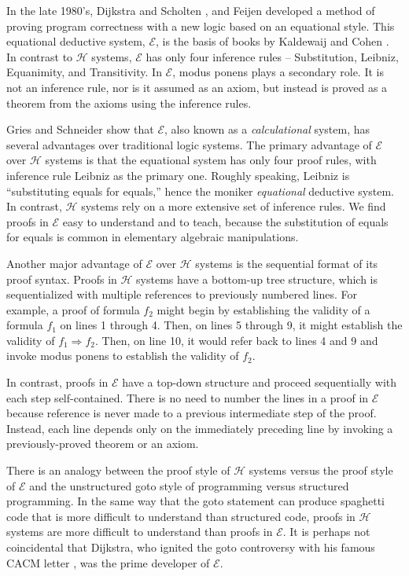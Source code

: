 \documentclass[12pt, fleqn, leqno]{article}
\newcommand{\impl}{\ensuremath{\Rightarrow}}        %
\begin{document}
In the late 1980's, Dijkstra and Scholten \cite{DandS}, and Feijen \cite{Feij} developed a method of proving program correctness with a new logic based on an equational style.
This equational deductive system, $\mathcal{E}$, is the basis of books by Kaldewaij \cite{Kald} and Cohen \cite{Cohen}.
In contrast to $\mathcal{H}$ systems, $\mathcal{E}$ has only four inference rules -- Substitution, Leibniz, Equanimity, and Transitivity.
In $\mathcal{E}$, modus ponens plays a secondary role.
It is not an inference rule, nor is it assumed as an axiom, but instead is proved as a theorem from the axioms using the inference rules.

Gries and Schneider \cite{Gries1995, Gries1995145} show that $\mathcal{E}$, also known as a \textit{calculational} system, has several advantages over traditional logic systems.
The primary advantage of $\mathcal{E}$ over $\mathcal{H}$ systems is that the equational system has only four proof rules, with inference rule Leibniz as the primary one.
Roughly speaking, Leibniz is ``substituting equals for equals,'' hence the moniker \textit{equational} deductive system.
In contrast, $\mathcal{H}$ systems rely on a more extensive set of inference rules.
We find proofs in $\mathcal{E}$ easy to understand and to teach, because the substitution of equals for equals is common in elementary algebraic manipulations.

Another major advantage of $\mathcal{E}$ over $\mathcal{H}$ systems is the sequential format of its proof syntax.
Proofs in $\mathcal{H}$ systems have a bottom-up tree structure, which is sequentialized with multiple references to previously numbered lines.
For example, a proof of formula $f_2$ might begin by establishing the validity  of a formula $f_1$ on lines 1 through 4.
Then, on lines 5 through 9, it might establish the validity of $f_1\impl f_2$.
Then, on line 10, it would refer back to lines 4 and 9 and invoke modus ponens to establish the validity of $f_2$.

In contrast, proofs in $\mathcal{E}$ have a top-down structure and proceed sequentially with each step self-contained.
There is no need to number the lines in a proof in $\mathcal{E}$ because reference is never made to a previous intermediate step of the proof.
Instead, each line depends only on the immediately preceding line by invoking a previously-proved theorem or an axiom.

There is an analogy between the proof style of $\mathcal{H}$ systems versus the proof style of $\mathcal{E}$ and the unstructured goto style of programming versus structured programming.
In the same way that the goto statement can produce spaghetti code that is more difficult to understand than structured code, proofs in $\mathcal{H}$ systems are more difficult to understand than proofs in $\mathcal{E}$.
It is perhaps not coincidental that Dijkstra, who ignited the goto controversy with his famous CACM letter \cite{Dijkstra:1968:LEG:362929.362947}, was the prime developer of $\mathcal{E}$.
\end{document}
